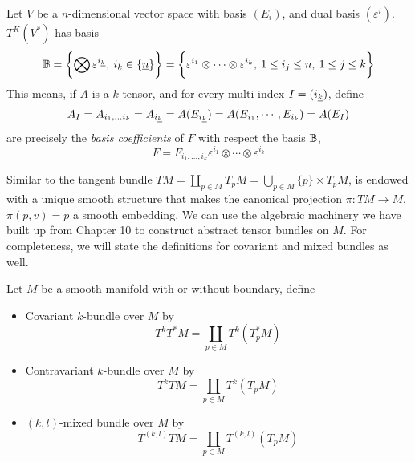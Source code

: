 \documentclass[../main-manifolds.tex]{subfiles}
\begin{document}
\begin{wts}[Basis of {$T^k(V^*)$}]
    Let $V$ be a $n$-dimensional vector space with basis $(E_i)$, and dual basis $(\varepsilon^i)$. $T^K(V^*)$ has basis
    \[
        \borel = \bigset{\bigotimes \varepsilon^{\Ul{i}[k]},\: \Ul{i}[k]\in \{\underline{n}\}} = \bigset{\varepsilon^{i_1}\otimes\cdots\otimes \varepsilon^{i_k},\: 1\leq i_j\leq n,\:  1\leq j\leq k}
    \]
    This means, if $A$ is a $k$-tensor, and for every multi-index $I = (\Ul{i}[k])$, define
    \[
        A_I = A_{i_1,\ldots i_k} = A_{\Ul{i}[k]} = A(E_{\Ul{i}[k]}) = A(E_{i_1},\cdots, E_{i_k}) = A(E_I)
    \]
    are precisely the \emph{basis coefficients} of $F$ with respect the basis ${\mathbb{B}}$, 
    \begin{equation}
        F = F_{i_1,\ldots, i_k}\varepsilon^{i_1}\otimes\cdots\otimes\varepsilon^{i_k}
    \end{equation}
\end{wts}
Similar to the tangent bundle $TM = \coprod_{p\in M}T_p M = \bigcup_{p\in M}\{p\}\times T_p M$, is endowed with a unique smooth structure that makes the canonical projection $\pi: TM\to M$, $\pi(p,v)=p$ a smooth embedding. We can use the algebraic machinery we have built up from Chapter 10 to construct abstract tensor bundles on $M$. For completeness, we will state the definitions for covariant and mixed bundles as well.
\begin{definition}\label{lee-chp12:tensor-bundles}
    Let $M$ be a smooth manifold with or without boundary, define
    \begin{itemize}
        \item Covariant $k$-bundle over $M$ by
        \[
            T^kT^*M = \coprod_{p\in M} T^k(T_p^*M)
        \]
        \item Contravariant $k$-bundle over $M$ by
        \[
            T^kTM = \coprod_{p\in M} T^k(T_pM)
        \]
        \item $(k,l)$-mixed bundle over $M$ by
        \[
            T^{(k,l)}TM = \coprod_{p\in M}T^{(k,l)}(T_pM)
        \]
    \end{itemize}
\end{definition}
\end{document}

